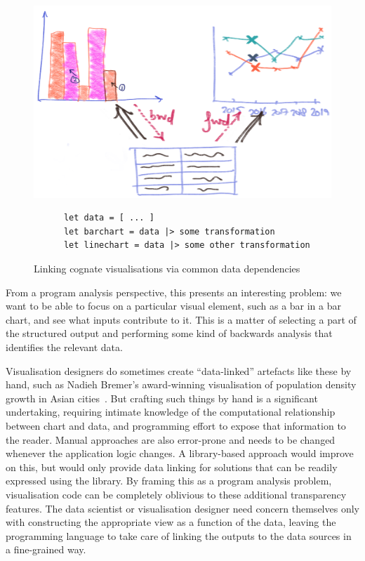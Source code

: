 \begin{figure}[H]
   {\includegraphics[scale=0.14]{fig/example/vis-linking.png}}
   \small
   \begin{lstlisting}
      let data = [ ... ]
      let barchart = data |> some transformation
      let linechart = data |> some other transformation
   \end{lstlisting}
   \caption{Linking cognate visualisations via common data dependencies}
   \label{fig:introduction:vis-linking}
\end{figure}

\noindent From a program analysis perspective, this presents an interesting problem: we want to be able to focus on a particular visual element, such as a bar in a bar chart, and see what inputs contribute to it. This is a matter of selecting a part of the structured output and performing some kind of backwards analysis that identifies the relevant data.

Visualisation designers do sometimes create ``data-linked'' artefacts like these by hand, such as Nadieh Bremer's award-winning visualisation of population density growth in Asian cities~\cite{bremer15}. But crafting such things by hand is a significant undertaking, requiring intimate knowledge of the computational relationship between chart and data, and programming effort to expose that information to the reader. Manual approaches are also error-prone and needs to be changed whenever the application logic changes. A library-based approach would improve on this, but would only provide data linking for solutions that can be readily expressed using the library. By framing this as a program analysis problem, visualisation code can be completely oblivious to these additional transparency features. The data scientist or visualisation designer need concern themselves only with constructing the appropriate view as a function of the data, leaving the programming language to take care of linking the outputs to the data sources in a fine-grained way.

